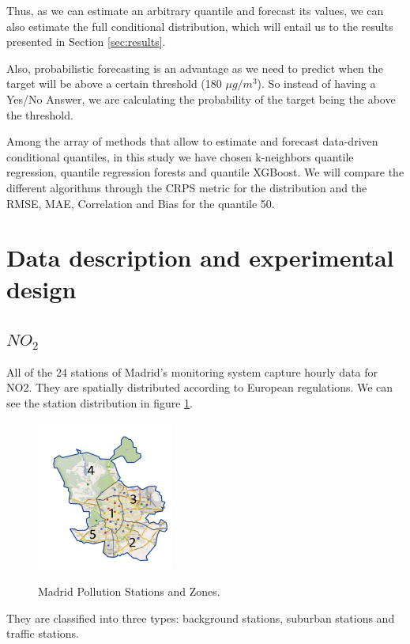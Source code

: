 \documentclass[a4paper,twocolumn,5p]{elsarticle}
\begin{document}
Thus, as we can estimate an arbitrary quantile and forecast its
values, we can also estimate the full conditional distribution, which
will entail us to the results presented in Section \ref{sec:results}.

Also, probabilistic forecasting is an advantage as we need to predict 
when the target will be above a certain threshold (180 $\mu g / m^3$). 
So instead of having a 
Yes/No Answer, we are calculating the probability of the target being the above 
the threshold.

Among the array of methods that allow to estimate and forecast
data-driven conditional quantiles, in this study we have chosen
k-neighbors quantile regression, quantile regression forests and quantile XGBoost. 
We will compare the different algorithms through the CRPS metric for the 
distribution and the RMSE, MAE, Correlation and Bias for the quantile 50.

\section{Data description and experimental design}

\subsection{$NO_2$}
\label{sec:no2}
All of the 24 stations of Madrid’s monitoring system capture hourly data for NO2. 
They are spatially distributed according to European regulations.
We can see the station distribution in figure \ref{figure:stations}.

\begin{figure}
  \centering
      \includegraphics[width=0.4\textwidth]{zonas_madrid}
      \label{figure:stations}
  \caption{Madrid Pollution Stations and Zones.}
\end{figure} 

They are classified into 
three types: background stations, suburban stations 
and traffic stations. 
\end{document}
